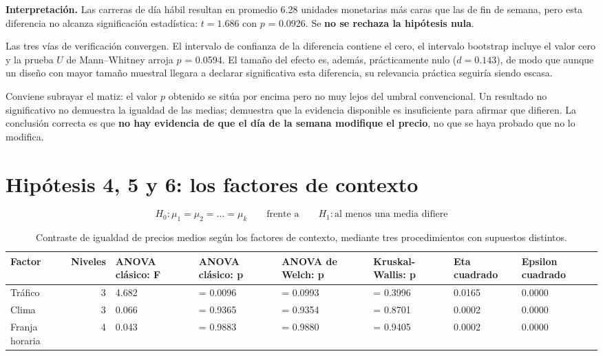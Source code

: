 \documentclass[
]{book}
\begin{document}
\textbf{Interpretación.} Las carreras de día hábil resultan en promedio
6.28 unidades monetarias más caras que las de fin de semana, pero
esta diferencia no alcanza significación estadística: \(t = 1.686\) con
\(p\) = 0.0926. Se \textbf{no se rechaza la hipótesis nula}.

Las tres vías de verificación convergen. El intervalo de confianza de la diferencia contiene
el cero, el intervalo bootstrap incluye el valor cero y la prueba \(U\) de Mann--Whitney arroja \(p\)
= 0.0594. El tamaño del efecto es, además, prácticamente nulo
(\(d = 0.143\)), de modo que aunque un diseño con mayor tamaño muestral llegara a
declarar significativa esta diferencia, su relevancia práctica seguiría siendo escasa.

Conviene subrayar el matiz: el valor \(p\) obtenido se sitúa por encima pero no muy lejos del
umbral convencional. Un resultado no significativo no demuestra la igualdad de las medias;
demuestra que la evidencia disponible es insuficiente para afirmar que difieren. La conclusión
correcta es que \textbf{no hay evidencia de que el día de la semana modifique el precio}, no que se
haya probado que no lo modifica.

\section{Hipótesis 4, 5 y 6: los factores de contexto}\label{hipuxf3tesis-4-5-y-6-los-factores-de-contexto}

\[H_0: \mu_1 = \mu_2 = \dots = \mu_k \qquad \text{frente a} \qquad
H_1: \text{al menos una media difiere}\]

\begin{table}

\caption{\label{tab:anovas}Contraste de igualdad de precios medios según los factores de contexto, mediante tres procedimientos con supuestos distintos.}
\centering
\begin{tabular}[t]{l|r|l|l|l|l|l|l}
\hline
Factor & Niveles & ANOVA clásico: F & ANOVA clásico: p & ANOVA de Welch: p & Kruskal-Wallis: p & Eta cuadrado & Epsilon cuadrado\\
\hline
Tráfico & 3 & 4.682 & = 0.0096 & = 0.0993 & = 0.3996 & 0.0165 & 0.0000\\
\hline
Clima & 3 & 0.066 & = 0.9365 & = 0.9354 & = 0.8701 & 0.0002 & 0.0000\\
\hline
Franja horaria & 4 & 0.043 & = 0.9883 & = 0.9880 & = 0.9405 & 0.0002 & 0.0000\\
\hline
\end{tabular}
\end{table}
\end{document}
